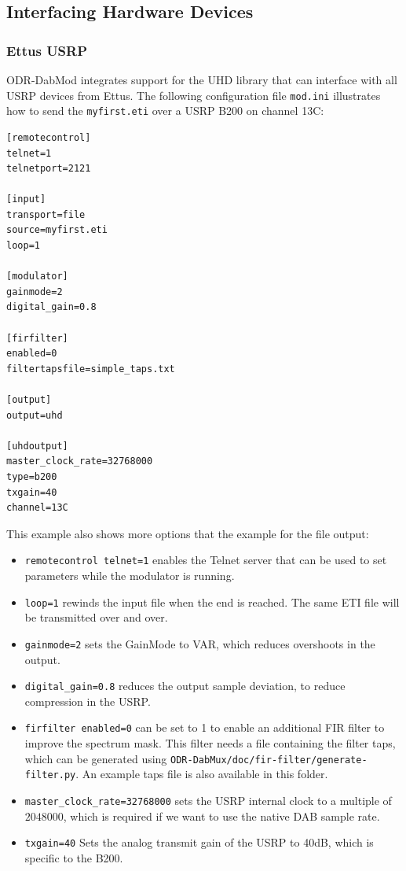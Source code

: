 \subsection{Interfacing Hardware Devices}
\subsubsection{Ettus USRP}
ODR-DabMod integrates support for the UHD library that can interface with all
USRP devices from Ettus. The following configuration file \texttt{mod.ini}
illustrates how to send the \texttt{myfirst.eti} over a USRP B200 on channel
13C:

\begin{lstlisting}
[remotecontrol]
telnet=1
telnetport=2121

[input]
transport=file
source=myfirst.eti
loop=1

[modulator]
gainmode=2
digital_gain=0.8

[firfilter]
enabled=0
filtertapsfile=simple_taps.txt

[output]
output=uhd

[uhdoutput]
master_clock_rate=32768000
type=b200
txgain=40
channel=13C
\end{lstlisting}

This example also shows more options that the example for the file output:

\begin{itemize}
    \item \texttt{remotecontrol telnet=1} enables the Telnet server that can be
        used to set parameters while the modulator is running.
    \item \texttt{loop=1} rewinds the input file when the end is reached. The
        same ETI file will be transmitted over and over.
    \item \texttt{gainmode=2} sets the GainMode to VAR, which reduces
        overshoots in the output.
    \item \texttt{digital\_gain=0.8} reduces the output sample deviation, to
        reduce compression in the USRP.
    \item \texttt{firfilter enabled=0} can be set to 1 to enable an additional
        FIR filter to improve the spectrum mask. This filter needs a file
        containing the filter taps, which can be generated using
        \texttt{ODR-DabMux/doc/fir-filter/generate-filter.py}. An example taps
        file is also available in this folder.
    \item \texttt{master\_clock\_rate=32768000} sets the USRP internal clock to
        a multiple of $2048000$, which is required if we want to use the native
        DAB sample rate.
    \item \texttt{txgain=40} Sets the analog transmit gain of the USRP to 40dB,
        which is specific to the B200.
\end{itemize}

